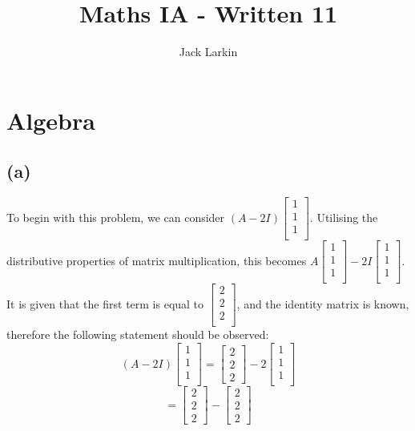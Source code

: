 \documentclass[11pt]{article}
\title{\textbf{Maths IA - Written 11}}
\date{}
\author{Jack Larkin}
\begin{document}
\maketitle
\section*{Algebra}
\subsection*{(a)}
To begin with this problem, we can consider $(A-2I)\begin{bmatrix}1\\1\\1\\\end{bmatrix}$. Utilising the distributive properties of matrix multiplication, this becomes $A\begin{bmatrix}1\\1\\1\\\end{bmatrix}-2I\begin{bmatrix}1\\1\\1\\\end{bmatrix}$. It is given that the first term is equal to $\begin{bmatrix}2\\2\\2\\\end{bmatrix}$, and the identity matrix is known, therefore the following statement should be observed:
$$(A-2I)\begin{bmatrix}1\\1\\1\\\end{bmatrix}=\begin{bmatrix}2\\2\\2\end{bmatrix}-2\begin{bmatrix}1\\1\\1\\\end{bmatrix}$$
$$=\begin{bmatrix}2\\2\\2\end{bmatrix}-\begin{bmatrix}2\\2\\2\end{bmatrix}$$
\end{document}

